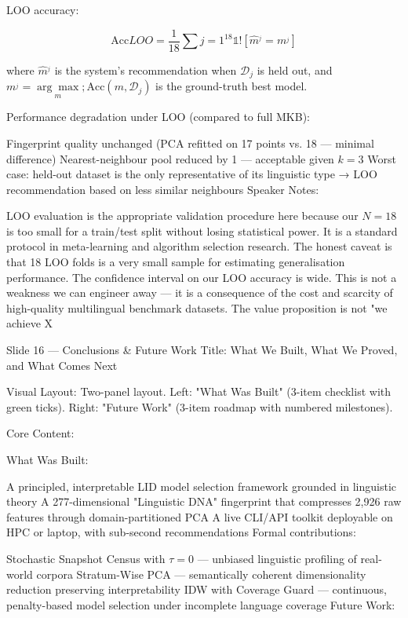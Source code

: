 LOO accuracy:

$$\text{Acc}{LOO} = \frac{1}{18} \sum{j=1}^{18} \mathbb{1}!\left[\hat{m}^_j = m^_j\right]$$

where $\hat{m}^_j$ is the system's recommendation when $\mathcal{D}_j$ is held out, and $m^_j = \underset{m}{\arg\max}; \text{Acc}(m, \mathcal{D}_j)$ is the ground-truth best model.

Performance degradation under LOO (compared to full MKB):

Fingerprint quality unchanged (PCA refitted on 17 points vs. 18 — minimal difference)
Nearest-neighbour pool reduced by 1 — acceptable given $k=3$
Worst case: held-out dataset is the only representative of its linguistic type → LOO recommendation based on less similar neighbours
Speaker Notes:

LOO evaluation is the appropriate validation procedure here because our $N=18$ is too small for a train/test split without losing statistical power. It is a standard protocol in meta-learning and algorithm selection research. The honest caveat is that 18 LOO folds is a very small sample for estimating generalisation performance. The confidence interval on our LOO accuracy is wide. This is not a weakness we can engineer away — it is a consequence of the cost and scarcity of high-quality multilingual benchmark datasets. The value proposition is not "we achieve X%

Slide 16 — Conclusions & Future Work
Title: What We Built, What We Proved, and What Comes Next

Visual Layout: Two-panel layout. Left: "What Was Built" (3-item checklist with green ticks). Right: "Future Work" (3-item roadmap with numbered milestones).

Core Content:

What Was Built:

A principled, interpretable LID model selection framework grounded in linguistic theory
A 277-dimensional "Linguistic DNA" fingerprint that compresses 2,926 raw features through domain-partitioned PCA
A live CLI/API toolkit deployable on HPC or laptop, with sub-second recommendations
Formal contributions:

Stochastic Snapshot Census with $\tau = 0$ — unbiased linguistic profiling of real-world corpora
Stratum-Wise PCA — semantically coherent dimensionality reduction preserving interpretability
IDW with Coverage Guard — continuous, penalty-based model selection under incomplete language coverage
Future Work:

